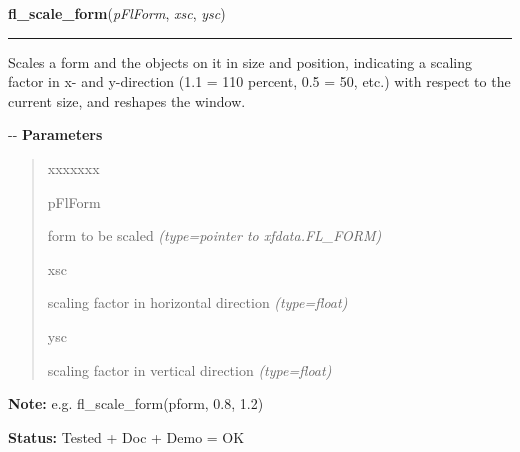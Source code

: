 \hspace{.8\funcindent}\begin{boxedminipage}{\funcwidth}

    \raggedright \textbf{fl\_scale\_form}(\textit{pFlForm}, \textit{xsc}, \textit{ysc})

    \vspace{-1.5ex}

    \rule{\textwidth}{0.5\fboxrule}
\setlength{\parskip}{2ex}

Scales a form and the objects on it in size and position, indicating
a scaling factor in x- and y-direction (1.1 = 110 percent, 0.5 = 50,
etc.) with respect to the current size, and reshapes the window.

-{}-
\setlength{\parskip}{1ex}
      \textbf{Parameters}
      \vspace{-1ex}

      \begin{quote}
        \begin{Ventry}{xxxxxxx}

          \item[pFlForm]


form to be scaled
            {\it (type=pointer to xfdata.FL\_FORM)}

          \item[xsc]


scaling factor in horizontal direction
            {\it (type=float)}

          \item[ysc]


scaling factor in vertical direction
            {\it (type=float)}

        \end{Ventry}

      \end{quote}

\textbf{Note:} 
e.g. fl\_scale\_form(pform, 0.8, 1.2)


\textbf{Status:} 
Tested + Doc + Demo = OK


    \end{boxedminipage}

    \label{xformslib:flbasic:fl_set_form_position}

    \vspace{0.5ex}

